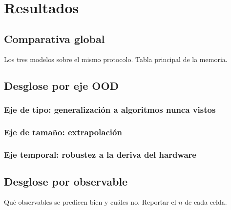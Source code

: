 \chapter{Resultados}
\label{cap:resultados}

%
%
%

\section{Comparativa global}
\label{sec:comparativa}
Los tres modelos sobre el mismo protocolo. Tabla principal de la memoria.

\section{Desglose por eje OOD}
\label{sec:desglose}
\subsection{Eje de tipo: generalización a algoritmos nunca vistos}
\subsection{Eje de tamaño: extrapolación}
\subsection{Eje temporal: robustez a la deriva del hardware}

\section{Desglose por observable}
\label{sec:por_observable}
Qué observables se predicen bien y cuáles no. Reportar el $n$ de cada celda.

